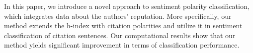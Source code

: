 In this paper, we introduce a novel approach to sentiment polarity classification, which integrates data about the authors' reputation. More specifically, our method extends the h-index with citation polarities and utilize it in sentiment classification of citation sentences. Our computational results show that our method yields significant improvement in terms of classification performance.
